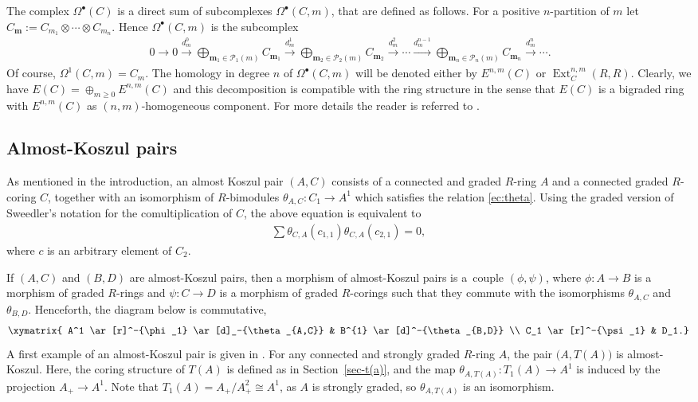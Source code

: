 \documentclass[pdftex]{sigma}
\def\b{\bullet}
\newcommand\ot{\otimes}
\newcommand\rar{\rightarrow}
\renewcommand{\^}[1]{\mbox{$^{\left( #1 \right)}$}}
\renewcommand{\_}[1]{\mbox{$_{\left( #1 \right)}$}}
\numberwithin{equation}{section}
\begin{document}
The complex $\Omega^\b(C)$ is a direct sum of subcomplexes $\Omega^\b(C,m)$, that are def\/ined as follows. For a positive $n$-partition of $m$ let $C_{\boldsymbol{m}}:=C_{m_1}\ot \cdots\ot C_{m_n}$. Hence $\Omega^\b(C,m)$ is the subcomplex
\begin{gather*}
\ 0 \xrightarrow{\ \ \ } 0 \xrightarrow{d_m^0} \bigoplus \limits_{\boldsymbol{m}_1\in\mathscr{P}_1(m)} C_{\boldsymbol{m}_1} \xrightarrow{d_m^1} \bigoplus \limits_{\boldsymbol{m}_2\in\mathscr{P}_2(m)} C_{\boldsymbol{m}_2} \xrightarrow{d_m^2} \cdots \xrightarrow{d^{n-1}_m}  \bigoplus \limits_{\boldsymbol{m}_n\in\mathscr{P}_{n}(m)} C_{\boldsymbol{m}_n} \xrightarrow{d_m^n}\cdots .
\end{gather*}
Of course, $\Omega^1(C,m)=C_m$. The homology in degree $n$ of $\Omega^\bullet(C,m)$ will be denoted either by $E^{n,m}(C)$ or $\operatorname{Ext}^{n,m}_C(R,R)$. Clearly, we have $E(C)=\oplus_{m\geq 0}E^{n,m}(C)$ and this decomposition is compatible with the ring structure in the sense that $E(C)$ is a bigraded ring with $E^{n,m}(C)$ as $(n,m)$-homogeneous component. For more details the reader is referred to \cite[Section~1.15]{jps}.

\subsection{Almost-Koszul pairs} \label{sec:almost}
As mentioned in the introduction, an almost Koszul pair $(A,C)$ consists of a connected and graded $R$-ring $A$ and a connected graded $R$-coring $C$, together with an isomorphism of $R$-bimodules $\theta_{A,C} \colon C_1 \rightarrow A^1$ which satisf\/ies the relation \eqref{ec:theta}. Using the graded version of Sweedler's notation for the comultiplication of $C$, the above equation is equivalent to
\begin{gather} \label{ec:qksz}
	\sum \theta_{C,A}(c_{1,1})\theta_{C,A}(c_{2,1})=0,
\end{gather}
where $c$ is an arbitrary element of $C_2$.

If $(A,C)$ and $(B,D)$ are almost-Koszul pairs, then a morphism of almost-Koszul pairs is a~couple $(\phi,\psi)$, where $\phi\colon A \rar B$ is a morphism of graded $R$-rings and $\psi\colon C \rar D$ is a morphism of graded $R$-corings such that they commute with the isomorphisms $\theta_{A,C}$ and $\theta_{B,D}$. Henceforth, the diagram below is commutative,
\begin{gather*}
 \xymatrix{ A^1 \ar[r]^-{\phi_1} \ar[d]_-{\theta_{A,C}} & B^{1} \ar[d]^-{\theta_{B,D}} \\
C_1 \ar[r]^-{\psi_1} & D_1.}
\end{gather*}
A f\/irst example of an almost-Koszul pair is given in \cite[Proposition 1.8]{jps}. For any connected and strongly graded $R$-ring $A$, the pair $\big(A,T(A)\big)$ is almost-Koszul. Here, the coring structure of $T(A)$ is def\/ined as in Section~\ref{sec-t(a)}, and the map $\theta_{A,T(A)}\colon T_1(A)\to A^1$ is induced by the projection $A_+\to A^1$. Note that $T_1(A)=A_+/A_+^2\cong A^1$, as $A$ is strongly graded, so $\theta_{A,T(A)}$ is an isomorphism.
\end{document}
